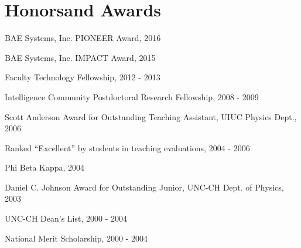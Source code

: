 \section{\sc Honors\newline and Awards} %
\begin{list2}
\item[-] BAE Systems, Inc. PIONEER Award, 2016
\item[-] BAE Systems, Inc. IMPACT Award, 2015
\item[-] Faculty Technology Fellowship, 2012 - 2013
\item[-] Intelligence Community Postdoctoral Research Fellowship, 2008 - 2009
\item[-] Scott Anderson Award for Outstanding Teaching Assistant, UIUC Physics Dept., 2006
\item[-] Ranked ``Excellent'' by students in teaching evaluations, 2004 - 2006
\item[-] Phi Beta Kappa, 2004
\item[-] Daniel C. Johnson Award for Outstanding Junior, UNC-CH Dept. of Physics, 2003
\item[-] UNC-CH Dean's List, 2000 - 2004
\item[-] National Merit Scholarship, 2000 - 2004
\end{list2}

